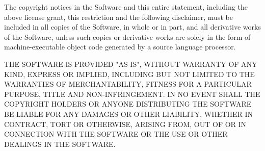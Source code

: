 \vparasmall
The copyright notices in the Software and this entire statement, including
the above license grant, this restriction and the following disclaimer,
must be included in all copies of the Software, in whole or in part, and
all derivative works of the Software, unless such copies or derivative
works are solely in the form of machine-executable object code generated by
a source language processor.

\vparasmall
THE SOFTWARE IS PROVIDED "AS IS", WITHOUT WARRANTY OF ANY KIND, EXPRESS OR
IMPLIED, INCLUDING BUT NOT LIMITED TO THE WARRANTIES OF MERCHANTABILITY,
FITNESS FOR A PARTICULAR PURPOSE, TITLE AND NON-INFRINGEMENT. IN NO EVENT
SHALL THE COPYRIGHT HOLDERS OR ANYONE DISTRIBUTING THE SOFTWARE BE LIABLE
FOR ANY DAMAGES OR OTHER LIABILITY, WHETHER IN CONTRACT, TORT OR OTHERWISE,
ARISING FROM, OUT OF OR IN CONNECTION WITH THE SOFTWARE OR THE USE OR OTHER
DEALINGS IN THE SOFTWARE.



%
%
%
%
%
%
%
%
%
%



